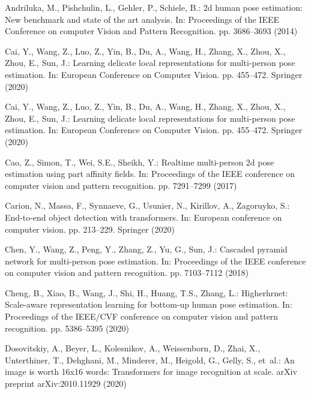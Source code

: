 \documentclass[runningheads]{llncs}
\begin{document}
\newpage
\begin{thebibliography}{10}
\providecommand{\url}[1]{\texttt{#1}}
\providecommand{\urlprefix}{URL }
\providecommand{\doi}[1]{https://doi.org/#1}

Andriluka, M., Pishchulin, L., Gehler, P., Schiele, B.: 2d human pose
  estimation: New benchmark and state of the art analysis. In: Proceedings of
  the IEEE Conference on computer Vision and Pattern Recognition. pp.
  3686--3693 (2014)

Cai, Y., Wang, Z., Luo, Z., Yin, B., Du, A., Wang, H., Zhang, X., Zhou, X.,
  Zhou, E., Sun, J.: Learning delicate local representations for multi-person
  pose estimation. In: European Conference on Computer Vision. pp. 455--472.
  Springer (2020)

Cai, Y., Wang, Z., Luo, Z., Yin, B., Du, A., Wang, H., Zhang, X., Zhou, X.,
  Zhou, E., Sun, J.: Learning delicate local representations for multi-person
  pose estimation. In: European Conference on Computer Vision. pp. 455--472.
  Springer (2020)

Cao, Z., Simon, T., Wei, S.E., Sheikh, Y.: Realtime multi-person 2d pose
  estimation using part affinity fields. In: Proceedings of the IEEE conference
  on computer vision and pattern recognition. pp. 7291--7299 (2017)

Carion, N., Massa, F., Synnaeve, G., Usunier, N., Kirillov, A., Zagoruyko, S.:
  End-to-end object detection with transformers. In: European conference on
  computer vision. pp. 213--229. Springer (2020)

Chen, Y., Wang, Z., Peng, Y., Zhang, Z., Yu, G., Sun, J.: Cascaded pyramid
  network for multi-person pose estimation. In: Proceedings of the IEEE
  conference on computer vision and pattern recognition. pp. 7103--7112 (2018)

Cheng, B., Xiao, B., Wang, J., Shi, H., Huang, T.S., Zhang, L.: Higherhrnet:
  Scale-aware representation learning for bottom-up human pose estimation. In:
  Proceedings of the IEEE/CVF conference on computer vision and pattern
  recognition. pp. 5386--5395 (2020)

Dosovitskiy, A., Beyer, L., Kolesnikov, A., Weissenborn, D., Zhai, X.,
  Unterthiner, T., Dehghani, M., Minderer, M., Heigold, G., Gelly, S., et~al.:
  An image is worth 16x16 words: Transformers for image recognition at scale.
  arXiv preprint arXiv:2010.11929  (2020)


\end{thebibliography}
\end{document}
